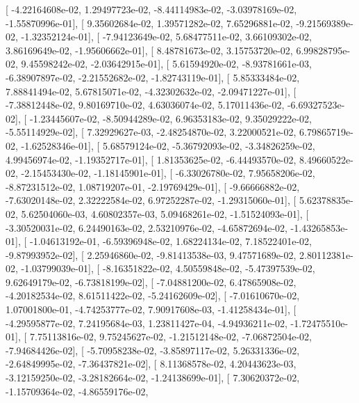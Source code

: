 \documentclass{article}
\begin{document}
       [ -4.22164608e-02,   1.29497723e-02,  -8.44114983e-02,
         -3.03978169e-02,  -1.55870996e-01],
       [  9.35602684e-02,   1.39571282e-02,   7.65296881e-02,
         -9.21569389e-02,  -1.32352124e-01],
       [ -7.94123649e-02,   5.68477511e-02,   3.66109302e-02,
          3.86169649e-02,  -1.95606662e-01],
       [  8.48781673e-02,   3.15753720e-02,   6.99828795e-02,
          9.45598242e-02,  -2.03642915e-01],
       [  5.61594920e-02,  -8.93781661e-03,  -6.38907897e-02,
         -2.21552682e-02,  -1.82743119e-01],
       [  5.85333484e-02,   7.88841494e-02,   5.67815071e-02,
         -4.32302632e-02,  -2.09471227e-01],
       [ -7.38812448e-02,   9.80169710e-02,   4.63036074e-02,
          5.17011436e-02,  -6.69327523e-02],
       [ -1.23445607e-02,  -8.50944289e-02,   6.96353183e-02,
          9.35029222e-02,  -5.55114929e-02],
       [  7.32929627e-03,  -2.48254870e-02,   3.22000521e-02,
          6.79865719e-02,  -1.62528346e-01],
       [  5.68579124e-02,  -5.36792093e-02,  -3.34826259e-02,
          4.99456974e-02,  -1.19352717e-01],
       [  1.81353625e-02,  -6.44493570e-02,   8.49660522e-02,
         -2.15453430e-02,  -1.18145901e-01],
       [ -6.33026780e-02,   7.95658206e-02,  -8.87231512e-02,
          1.08719207e-01,  -2.19769429e-01],
       [ -9.66666882e-02,  -7.63020148e-02,   2.32222584e-02,
          6.97252287e-02,  -1.29315060e-01],
       [  5.62378835e-02,   5.62504060e-03,   4.60802357e-03,
          5.09468261e-02,  -1.51524093e-01],
       [ -3.30520031e-02,   6.24490163e-02,   2.53210976e-02,
         -4.65872694e-02,  -1.43265853e-01],
       [ -1.04613192e-01,  -6.59396948e-02,   1.68224134e-02,
          7.18522401e-02,  -9.87993952e-02],
       [  2.25946860e-02,  -9.81413538e-03,   9.47571689e-02,
          2.80112381e-02,  -1.03799039e-01],
       [ -8.16351822e-02,   4.50559848e-02,  -5.47397539e-02,
          9.62649179e-02,  -6.73818199e-02],
       [ -7.04881200e-02,   6.47865908e-02,  -4.20182534e-02,
          8.61511422e-02,  -5.24162609e-02],
       [ -7.01610670e-02,   1.07001800e-01,  -4.74253777e-02,
          7.90917608e-03,  -1.41258434e-01],
       [ -4.29595877e-02,   7.24195684e-03,   1.23811427e-04,
         -4.94936211e-02,  -1.72475510e-01],
       [  7.75113816e-02,   9.75245627e-02,  -1.21512148e-02,
         -7.06872504e-02,  -7.94684426e-02],
       [ -5.70958238e-02,  -3.85897117e-02,   5.26331336e-02,
         -2.64849995e-02,  -7.36437821e-02],
       [  8.11368578e-02,   4.20443623e-03,  -3.12159250e-02,
         -3.28182664e-02,  -1.24138699e-01],
       [  7.30620372e-02,  -1.15709364e-02,  -4.86559176e-02,
\end{document}
